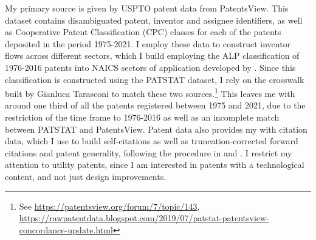 My primary source is given by USPTO patent data from PatentsView.
This dataset contains disambiguated patent, inventor and assignee
identifiers, as well as Cooperative Patent Classification (CPC) classes
for each of the patents deposited in the period 1975-2021. I employ
these data to construct inventor flows across different sectors, which
I build employing the ALP classification of 1976-2016 patents into
NAICS sectors of application developed by \citet{goldschlagAlgorithmicLinksProbabilities2016}.
Since this classification is constructed using the PATSTAT dataset,
I rely on the crosswalk built by Gianluca Tarasconi to match these
two sources.\footnote{See \href{https://patentsview.org/forum/7/topic/143}{https://patentsview.org/forum/7/topic/143},
\href{https://rawpatentdata.blogspot.com/2019/07/patstat-patentsview-concordance-update.html}{https://rawpatentdata.blogspot.com/2019/07/patstat-patentsview-concordance-update.html}} This leaves me with around one third of all the patents registered
between 1975 and 2021, due to the restriction of the time frame to
1976-2016 as well as an incomplete match between PATSTAT and PatentsView.
Patent data also provides my with citation data, which I use to build
self-citations as well as truncation-corrected forward citations and
patent generality, following the procedure in \citet{hallNBERPatentCitation2001}
and \citet{acemogluRadicalIncrementalInnovationForthcoming}. I restrict
my attention to utility patents, since I am interested in patents
with a technological content, and not just design improvements.

